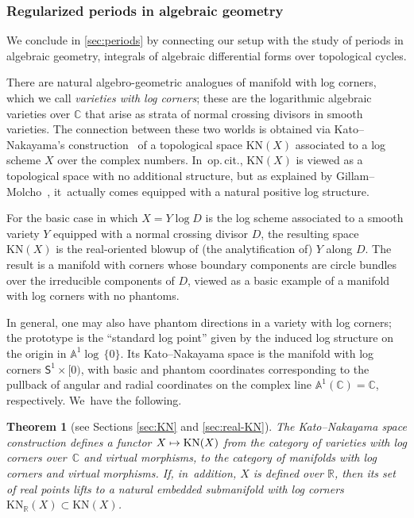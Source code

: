 \documentclass[JEP,XML,SOM,Unicode,NoFloatCountersInSection,published]{cedram}
\newcommand\mto{\mathchoice{\longmapsto}{\mapsto}{\mapsto}{\mapsto}}
\newtheorem{theorem}{Theorem}[section]
\theoremstyle{definition}
\theoremstyle{remark}
\let\defn\emph
\newcommand{\CC}{\mathbb{C}}
\newcommand{\RR}{\mathbb{R}}
\newcommand{\AF}{\mathbb{A}}
\newcommand{\logcyl}{\AF^1 \log\, \{0\}}
\newcommand{\rbrac}[1]{\left(#1\right)}
\newcommand{\KN}[1]{\mathrm{KN}(#1)}
\newcommand{\KNR}[1]{\mathrm{KN}_\RR\rbrac{#1}}
\newcommand{\unitcirc}{\mathsf{S}^{1}}
\begin{document}
\subsubsection{Regularized periods in algebraic geometry}

We conclude in \autoref{sec:periods} by connecting our setup with the study of periods in algebraic geometry, \ie integrals of algebraic differential forms over topological cycles.

There are natural algebro-geometric analogues of manifold with log corners, which we call \defn{varieties with log corners}; these are the logarithmic algebraic varieties over $\CC$ that arise as strata of normal crossing divisors in smooth varieties. The connection between these two worlds is obtained via Kato--Nakayama's construction~\cite{KatoNakayama} of a topological space $\KN{X}$ associated to a log scheme $X$ over the complex numbers. In~{op.\,cit.}, $\KN{X}$ is viewed as a topological space with no additional structure, but as explained by Gillam--Molcho~\cite{GillamMolcho}, it~actually comes equipped with a natural positive log structure.

For the basic case in which $X = Y \log D$ is the log scheme associated to a smooth variety $Y$ equipped with a normal crossing divisor $D$, the resulting space $\KN{X}$ is the real-oriented blowup of (the analytification of) $Y$ along $D$. The result is a manifold with corners whose boundary components are circle bundles over the irreducible components of $D$, viewed as a basic example of a manifold with log corners with no phantoms.

In general, one may also have phantom directions in a variety with log corners; the prototype is the ``standard log point'' given by the induced log structure on the origin in $\logcyl$. Its Kato--Nakayama space is the manifold with log corners $\unitcirc \times [0)$, with basic and phantom coordinates corresponding to the pullback of angular and radial coordinates on the complex line $\AF^1(\CC) = \CC$, respectively. We~have the following.

\begin{theorem}[see Sections \ref{sec:KN} and \ref{sec:real-KN}]
The Kato--Nakayama space construction defines a functor $X \mto \KN{X}$ from the category of varieties with log corners over~$\CC$ and virtual morphisms, to the category of manifolds with log corners and virtual morphisms. If, in~addition, $X$ is defined over $\RR$, then its set of real points lifts to a natural embedded submanifold with log corners $\KNR{X}\subset \KN{X}$.
\end{theorem}
\end{document}
